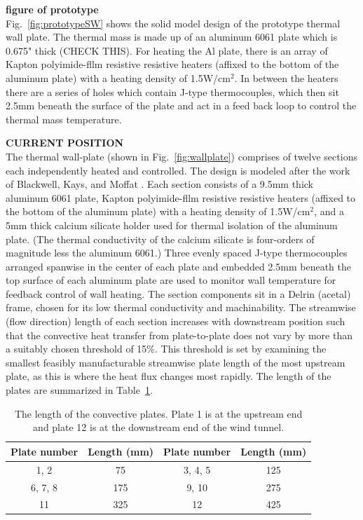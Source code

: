 {\bf figure of prototype}\\

Fig.~\ref{fig:prototypeSW} shows the solid model design of the prototype thermal wall plate.
The thermal mass is made up of an aluminum 6061 plate which is 0.675" thick (CHECK THIS).
For heating the Al plate, there is an array of Kapton polyimide-fllm resistive resistive heaters (affixed to the bottom of the aluminum plate) with a heating density of 1.5W/cm$^2$.
In between the heaters there are a series of holes which contain J-type thermocouples, which then sit 2.5mm beneath the surface of the plate and act in a feed back loop to control the thermal mass temperature.

{\bf CURRENT POSITION}\\

The thermal wall-plate (shown in Fig.~\ref{fig:wallplate}) comprises of twelve sections each independently heated and controlled. The design is modeled after the work of Blackwell, Kays, and Moffat \cite{Blackwell_1972}. Each section consists of a 9.5mm thick aluminum 6061 plate, Kapton polyimide-fllm resistive resistive heaters (affixed to the bottom of the aluminum plate) with a heating density of 1.5W/cm$^2$, and a 5mm thick calcium silicate holder used for thermal isolation of the aluminum plate. (The thermal conductivity of the calcium silicate is four-orders of magnitude less the aluminum 6061.) Three evenly spaced J-type thermocouples arranged spanwise in the center of each plate and embedded 2.5mm beneath the top surface of each aluminum plate are used to monitor wall temperature for feedback control of wall heating. The section components sit in a Delrin (acetal) frame, chosen for its low thermal conductivity and machinability. The streamwise (flow direction) length of each section increases with downstream position such that the convective heat transfer from plate-to-plate does not vary by more than a suitably chosen threshold of 15\%. This threshold is set by examining the smallest feasibly manufacturable streamwise plate length of the most upstream plate, as this is where the heat flux changes most rapidly. The length of the plates are summarized in Table~\ref{tab:plate}. 

\begin{table}[h] 
\centering
\caption{\indent The length of the convective plates. Plate 1 is at the upstream end and plate 12 is at the downstream end of the wind tunnel.}
\begin{tabular}{|c|c|c|c|}
	\hline
	 Plate number& Length (mm) & Plate number& Length (mm)\\ \hline
	1, 2& 75 & 3, 4, 5 & 125 \\ \hline
	6, 7, 8 & 175 & 9, 10 & 275 \\ \hline
	11 & 325 & 12 & 425 \\ \hline                                                       
\end{tabular}
\label{tab:plate}
\end{table}

